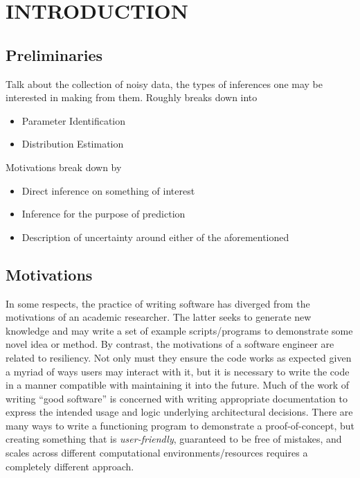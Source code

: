 \chapter{\uppercase{Introduction}} \label{chapter:01}

\section{Preliminaries}
Talk about the collection of noisy data, the types of inferences one may be interested in making from them.
Roughly breaks down into 
\begin{itemize}
  \item Parameter Identification
  \item Distribution Estimation
\end{itemize}

Motivations break down by

\begin{itemize}
  \item Direct inference on something of interest
  \item Inference for the purpose of prediction
  \item Description of uncertainty around either of the aforementioned
\end{itemize}

\section{Motivations}\label{sec:motivations}
In some respects, the practice of writing software has diverged from the motivations of an academic researcher.
The latter seeks to generate new knowledge and may write a set of example scripts/programs to demonstrate some novel idea or method.
By contrast, the motivations of a software engineer are related to resiliency.
Not only must they ensure the code works as expected given a myriad of ways users may interact with it, but it is necessary to write the code in a manner compatible with maintaining it into the future.
Much of the work of writing ``good software'' is concerned with writing appropriate documentation to express the intended usage and logic underlying architectural decisions.
There are many ways to write a functioning program to demonstrate a proof-of-concept, but creating something that is \emph{user-friendly}, guaranteed to be free of mistakes, and scales across different computational environments/resources requires a completely different approach.

